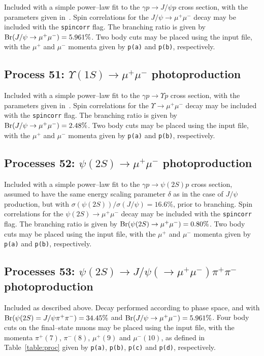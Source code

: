 \documentclass[12pt]{article}
\begin{document}
Included with a simple power--law fit to the $\gamma p\to J/\psi p$ cross section, with the parameters given in~\cite{Harland-Lang:2015cta}. Spin correlations for the $J/\psi\to \mu^+\mu^-$ decay may be included with the \texttt{spincorr} flag. The branching ratio is given by ${\rm Br}(J/\psi \to \mu^+\mu^-)=5.961\%$. Two body cuts may be placed using the input file, with the $\mu^+$ and $\mu^-$  momenta given by \texttt{p(a)} and \texttt{p(b)}, respectively.

\subsection{Process 51: $\Upsilon(1S) \to \mu^+\mu^-$ photoproduction}

Included with a simple power--law fit to the $\gamma p\to \Upsilon p$ cross section, with the parameters given in~\cite{Harland-Lang:2015cta}. Spin correlations for the $\Upsilon\to \mu^+\mu^-$ decay may be included with the \texttt{spincorr} flag. The branching ratio is given by ${\rm Br}(J/\psi \to \mu^+\mu^-)=2.48\%$. Two body cuts may be placed using the input file, with the $\mu^+$ and $\mu^-$  momenta given by \texttt{p(a)} and \texttt{p(b)}, respectively.

\subsection{Processes 52: $\psi(2S)\to \mu^+\mu^-$ photoproduction}

Included with a simple power--law fit to the $\gamma p\to \psi(2S) p$ cross section, assumed to have the same energy scaling parameter $\delta$ as in the case of $J/\psi$ production, but with $\sigma(\psi(2S))/\sigma(J/\psi)=16.6\%$, prior to branching. Spin correlations for the $\psi(2S)\to \mu^+\mu^-$ decay may be included with the \texttt{spincorr} flag. The branching ratio is given by ${\rm Br}(\psi(2S) \to \mu^+\mu^-)=0.80\%$. Two body cuts may be placed using the input file, with the $\mu^+$ and $\mu^-$ momenta given by \texttt{p(a)} and \texttt{p(b)}, respectively.

\subsection{Processes 53: $\psi(2S)\to J/\psi(\to \mu^+\mu^-) \pi^+\pi^-$ photoproduction}

Included as described above. Decay performed according to phase space, and with ${\rm Br}(\psi(2S)=J/\psi\pi^+\pi^-)=34.45\%$ and ${\rm Br}(J/\psi \to \mu^+\mu^-)=5.961\%$. Four body cuts on the final--state muons may be placed using the input file, with the momenta $\pi^+(7)$, $\pi^-(8)$, $\mu^+(9)$ and $\mu^-(10)$, as defined in Table~\ref{table:proc} given by \texttt{p(a)}, \texttt{p(b)}, \texttt{p(c)} and \texttt{p(d)}, respectively.
\end{document}
